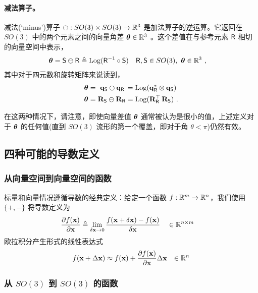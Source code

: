 \paragraph{减法算子。}
减法(`minus')算子 $\ominus:SO(3)\times SO(3)\to{\mathbb R}^3$ 是加法算子的逆运算。它返回在 $SO(3)$ 中的两个元素之间的向量角差 ${\bm \theta}\in{\mathbb R}^3$ 。这个差值在与参考元素 $\mathsf R$ 相切的向量空间中表示，
%
\begin{align}
{\bm \theta}=\mathsf S\ominus \mathsf R
&\triangleq \operatorname*{Log}(\mathsf R^{-1} \circ \mathsf S)     && \mathsf R,\mathsf S\in SO(3),~ {\bm \theta}\in{\mathbb R}^3  
~,
\end{align}
%
其中对于四元数和旋转矩阵来说读到，
%
\begin{align}
{\bm \theta} &= \,\,{\bf q}_\mathsf S\ominus{\bf q}_\mathsf R\, = \operatorname*{Log}({\bf q}_\mathsf R^*\otimes{\bf q}_\mathsf S)                      \\
{\bm \theta} &= {\bf R}_\mathsf S\ominus{\bf R}_\mathsf R = \operatorname*{Log}({\bf R}_\mathsf R^{\top}\,{\bf R}_\mathsf S)
~.
\end{align}

\bigskip
在这两种情况下，请注意，即使向量差值 ${\bm \theta}$ 通常被认为是很小的值，上述定义对于 ${\bm \theta}$ 的任何值(直到 $SO(3)$ 流形的第一个覆盖，即对于角 $\theta<\pi$)仍然有效。

\subsection{四种可能的导数定义}



\subsubsection{从向量空间到向量空间的函数}

标量和向量情况遵循导数的经典定义：给定一个函数 $f:{\mathbb R}^m\to{\mathbb R}^n$，我们使用 $\{+,-\}$ 将导数定义为
%
\begin{align}
\frac{\partial f({\bf x})}{\partial{\bf x}} &\triangleq \lim_{\delta{\bf x}\to0}\frac{f({\bf x}+\delta{\bf x})-f({\bf x})}{\delta{\bf x}} &&\in {\mathbb R}^{n\times m} \label{equ:derivative_vector}
\end{align}
%
欧拉积分产生形式的线性表达式
%
\begin{align*}
f({\bf x}+\Delta{\bf x}) &\approx f({\bf x}) + \frac{\partial f({\bf x})}{\partial{\bf x}}\Delta{\bf x}
& \in {\mathbb R}^n
\end{align*}

\subsubsection{从 $SO(3)$ 到 $SO(3)$ 的函数}


